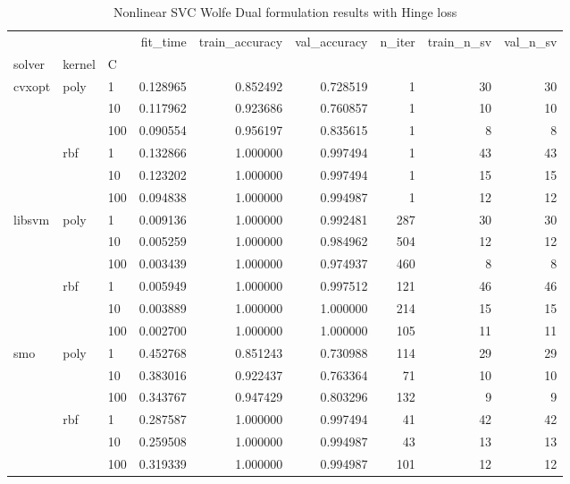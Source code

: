 \begin{table}[h!]
\centering
\caption{Nonlinear SVC Wolfe Dual formulation results with Hinge loss}
\label{nonlinear_dual_svc_cv_results}
\begin{tabular}{lllrrrrrr}
\toprule
    &     &     &  fit\_time &  train\_accuracy &  val\_accuracy &  n\_iter &  train\_n\_sv &  val\_n\_sv \\
solver & kernel & C &           &                 &               &         &             &           \\
\midrule
cvxopt & poly & 1   &  0.128965 &        0.852492 &      0.728519 &       1 &          30 &        30 \\
    &     & 10  &  0.117962 &        0.923686 &      0.760857 &       1 &          10 &        10 \\
    &     & 100 &  0.090554 &        0.956197 &      0.835615 &       1 &           8 &         8 \\
    & rbf & 1   &  0.132866 &        1.000000 &      0.997494 &       1 &          43 &        43 \\
    &     & 10  &  0.123202 &        1.000000 &      0.997494 &       1 &          15 &        15 \\
    &     & 100 &  0.094838 &        1.000000 &      0.994987 &       1 &          12 &        12 \\
libsvm & poly & 1   &  0.009136 &        1.000000 &      0.992481 &     287 &          30 &        30 \\
    &     & 10  &  0.005259 &        1.000000 &      0.984962 &     504 &          12 &        12 \\
    &     & 100 &  0.003439 &        1.000000 &      0.974937 &     460 &           8 &         8 \\
    & rbf & 1   &  0.005949 &        1.000000 &      0.997512 &     121 &          46 &        46 \\
    &     & 10  &  0.003889 &        1.000000 &      1.000000 &     214 &          15 &        15 \\
    &     & 100 &  0.002700 &        1.000000 &      1.000000 &     105 &          11 &        11 \\
smo & poly & 1   &  0.452768 &        0.851243 &      0.730988 &     114 &          29 &        29 \\
    &     & 10  &  0.383016 &        0.922437 &      0.763364 &      71 &          10 &        10 \\
    &     & 100 &  0.343767 &        0.947429 &      0.803296 &     132 &           9 &         9 \\
    & rbf & 1   &  0.287587 &        1.000000 &      0.997494 &      41 &          42 &        42 \\
    &     & 10  &  0.259508 &        1.000000 &      0.994987 &      43 &          13 &        13 \\
    &     & 100 &  0.319339 &        1.000000 &      0.994987 &     101 &          12 &        12 \\
\bottomrule
\end{tabular}
\end{table}
